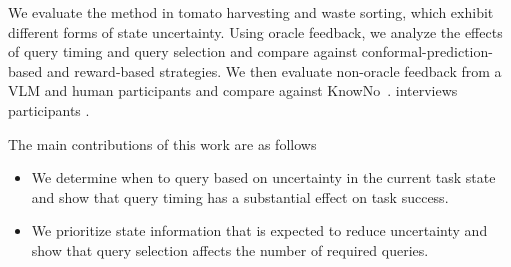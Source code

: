 We evaluate the method in tomato harvesting and waste sorting, which exhibit different forms of state uncertainty. Using oracle feedback, we analyze the effects of query timing and query selection and compare against conformal-prediction-based and reward-based strategies. We then evaluate non-oracle feedback from a VLM and human participants and compare against KnowNo~\cite{ren2023robots}.  interviews  participants .


The main contributions of this work are as follows

\begin{itemize}

\item We determine when to query based on uncertainty in the current task state and show that query timing has a substantial effect on task success.

\item We prioritize state information that is expected to reduce uncertainty and show that query selection affects the number of required queries.


\end{itemize}
